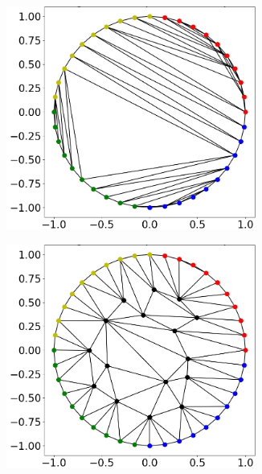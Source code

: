 \begin{figure}
  \begin{subfigure}[t]{0.31\textwidth}%
    \centering%
    \includegraphics[width=0.9\textwidth, trim=37mm 14mm 6mm 6mm, clip]{images/fiber_creation/mesh_plots/out_0_0_0_tri.png}%
    \label{fig:w_00}%
  \end{subfigure}
  \quad
  \begin{subfigure}[t]{0.31\textwidth}%
    \centering%
    \includegraphics[width=0.9\textwidth, trim=37mm 14mm 6mm 6mm, clip]{images/fiber_creation/mesh_plots/out_1_0_0_tri.png}%
    \label{fig:w_10}%

\end{subfigure}
\end{figure}
